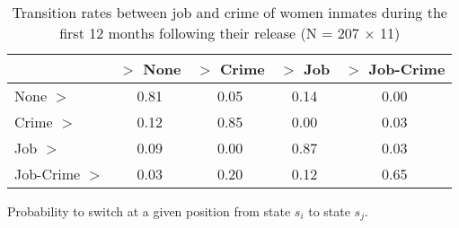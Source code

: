 \begin{table}[htp]
\footnotesize
\setlength{\tabcolsep}{10pt}
\renewcommand{\arraystretch}{1.3}
\begin{threeparttable}
\centering
\caption{Transition rates between job and crime of women inmates \newline
    during the first 12 months following their release (N = 207 $\times$ 11)} 
\label{tab:transition_rates_anyjob_crime}
\begin{tabular}{lcccc}
  \hline
 & $>$ None & $>$ Crime & $>$ Job & $>$ Job-Crime \\ 
  \hline
None $>$ & 0.81 & 0.05 & 0.14 & 0.00 \\ 
  Crime $>$ & 0.12 & 0.85 & 0.00 & 0.03 \\ 
  Job $>$ & 0.09 & 0.00 & 0.87 & 0.03 \\ 
  Job-Crime $>$ & 0.03 & 0.20 & 0.12 & 0.65 \\ 
   \hline
\end{tabular}
\begin{tablenotes}
\scriptsize
\item Probability to switch at a given position from state $s_i$ to state $s_j$.
\end{tablenotes}
\end{threeparttable}
\end{table}
